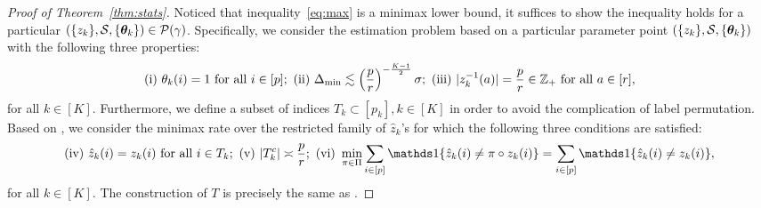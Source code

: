 \documentclass[lettersize,onecolumn,journal]{IEEEtran}
\theoremstyle{definition}
\theoremstyle{definition}
\begin{document}
\begin{proof}[Proof of Theorem~\ref{thm:stats}]
 Noticed that inequality~\eqref{eq:max} is a minimax lower bound, it suffices to show the inequality holds for a particular $(\{z_k\}, \mathcal{S}, \{\boldsymbol{\theta}_k\}) \in \mathcal{P}(\gamma)$. Specifically, we consider the estimation problem based on a particular parameter point $(\{z_k\}, \mathcal{S}, \{\boldsymbol{\theta}_k\})$ with the following three properties:
\begin{equation}\label{eq:construction}
    \text{(i)}\  \theta_k(i)=1 \text{ for all }i\in[p]; \  \text{(ii)}\ %
    \Delta_{\min}\lesssim  \left({p\over r}\right)^{-\frac{K-1}{2}}\sigma; \  \text{(iii)}\ |z^{-1}_k(a)|={p \over r} \in \mathbb{Z}_+ \text{ for all }a\in[r],
\end{equation}
for all $k \in [K]$.
Furthermore, we define a subset of indices $T_k \subset [p_k], k \in [K]$ in order to avoid the complication of label permutation. Based on \citet[Proof of Theorem 6]{han2020exact}, we consider the minimax rate over the restricted family of $\hat z_k$'s for which the following three conditions are satisfied:
\footnotesize
\begin{equation}
    \text{(iv)}\ \hat z_k(i)=z_k(i) \text{ for all }i\in T_k; \ \text{(v)} \ |T^c_k|\asymp {p\over r}; \ \text{(vi)}\ \min_{\pi\in \Pi}\sum_{i\in[p]}\ind\{\hat z_k(i) \neq \pi\circ z_k (i)\} = \sum_{i\in[p]}\ind\{\hat z_k(i) \neq  z_k (i)\},
\end{equation}
\normalsize
for all $k \in [K]$.
The construction of $T$ is precisely the same as \citet[Proof of Theorem 6]{han2020exact}. 

\end{proof}
\end{document}
